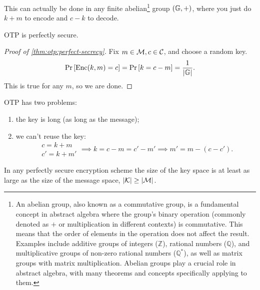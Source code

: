 This can actually be done in any finite abelian\footnote{An abelian group, also known as a commutative group, is a fundamental concept in abstract algebra where the group's binary operation (commonly denoted as \(+\) or multiplication in different contexts) is commutative. This means that the order of elements in the operation does not affect the result. Examples include additive groups of integers (\(\mathbb{Z}\)), rational numbers (\(\mathbb{Q}\)), and multiplicative groups of non-zero rational numbers (\(\mathbb{Q}^*\)), as well as matrix groups with matrix multiplication. Abelian groups play a crucial role in abstract algebra, with many theorems and concepts specifically applying to them.
} group $(\mathbb{G}, +)$, where you just do $k + m$ to encode and $c - k$ to decode.

\pagebreak

\begin{theorem} \label{thm:otp:perfect-secrecy}
	\ac{OTP} is perfectly secure.
\end{theorem}

\begin{proof}[Proof of \cref{thm:otp:perfect-secrecy}]
	Fix $m \in \mathcal{M}, c \in \mathcal{C}$, and choose a random key.
	\begin{equation*}
		\mathop{\mathrm{Pr}}\limits_{} \left[ {\mathrm{Enc}(k,m) = c} \right] = \mathop{\mathrm{Pr}}\limits_{} \left[ {k = c - m} \right] = \frac{1}{\left|{\mathbb{G}}\right|}.
	\end{equation*}
	This is true for any $m$, so we are done.
\end{proof}

\ac{OTP} has two problems:
\begin{enumerate}
	\item the key is long (as long as the message);
	\item we can't reuse the key:
	\begin{equation*}
		\begin{array}{c}
			c = k + m \\
			c' = k + m'
		\end{array}
		\implies
		k = c - m = c' - m'
		\implies
		m' = m - (c - c').
	\end{equation*}
\end{enumerate}

\begin{theorem}[Shannon, 1949] \label{thm:shannon:1949}
	In any perfectly secure encryption scheme the size of the key space is at least as large as the size of the message space, \ie $\left|{\mathcal{K}}\right| \ge \left|{\mathcal{M}}\right|$.
\end{theorem}


